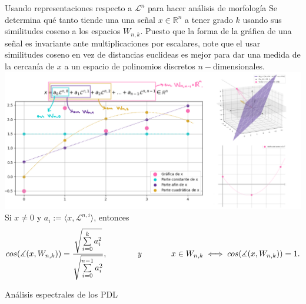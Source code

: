 \documentclass[final,hyperref={pdfpagelabels=false}]{beamer}
\newcommand{\IR}{\mathbb{R}}
\newcommand{\suma}[3]{\sum\limits_{#1}^{#2}#3} %
\newcommand{\cali}[1]{\mathcal{#1}} %
\begin{document}
\begin{frame}
\begin{columns}
\begin{column}{.49\textwidth}
            	\begin{block}{Usando representaciones respecto a 
            	$\cali{L}^{n}$ para hacer an\'alisis de morfolog\'ia}
            	Se determina qu\'e tanto tiende una una se\~nal $x \in \IR^{n}$ a tener 
            	grado $k$ usando sus similitudes coseno a los espacios
            	$W_{n,k}$. Puesto que la forma de la gr\'afica de una se\~nal
            	es invariante ante multiplicaciones por escalares, note que
            	el usar similitudes coseno en vez de distancias euclideas es
            	mejor para dar una medida de la cercan\'ia de $x$ a un espacio
            	de polinomios discretos $n-$dimensionales.
			\includegraphics[width=0.95\linewidth]{analisis_forma}	
			Si $x \neq 0$ y $a_{i} := \langle x, \cali{L}^{n,i} \rangle$, entonces 
			\[
			cos(\measuredangle(x, W_{n,k})) = 			
			\frac{
			\sqrt{\suma{i=0}{k}{a_{i}^{2}}}}
			{\sqrt{\suma{i=0}{n-1}{a_{i}^{2}}}},
			\hspace{1.3cm} \textit{y} \hspace{1.3cm}
			x \in W_{n,k} \iff cos(\measuredangle(x, W_{n,k})) = 1.
			\]			
			\end{block}			                        
            \vfill
            \vspace{1cm}


            \begin{block}{An\'alisis espectrales de los PDL}
              \begin{columns}
\end{columns}
\end{block}
\end{column}
\end{columns}
\end{frame}
\end{document}
